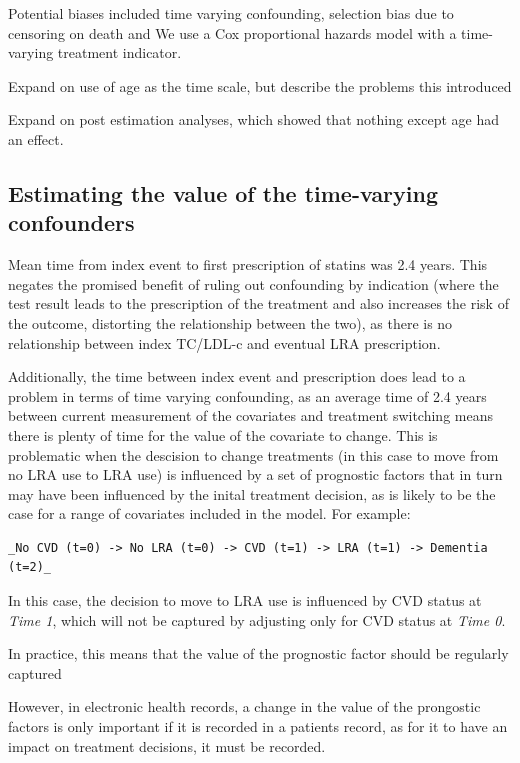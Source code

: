 \documentclass[a4paper, twoside]{templates/ociamthesis}
\begin{document}
Potential biases included time varying confounding, selection bias due to censoring on death and
We use a Cox proportional hazards model with a time-varying treatment indicator.

Expand on use of age as the time scale, but describe the problems this introduced

Expand on post estimation analyses, which showed that nothing except age had an effect.

\hypertarget{estimating-the-value-of-the-time-varying-confounders}{%
\subsection{Estimating the value of the time-varying confounders}\label{estimating-the-value-of-the-time-varying-confounders}}

Mean time from index event to first prescription of statins was 2.4 years. This negates the promised benefit of ruling out confounding by indication (where the test result leads to the prescription of the treatment and also increases the risk of the outcome, distorting the relationship between the two), as there is no relationship between index TC/LDL-c and eventual LRA prescription.

Additionally, the time between index event and prescription does lead to a problem in terms of time varying confounding, as an average time of 2.4 years between current measurement of the covariates and treatment switching means there is plenty of time for the value of the covariate to change. This is problematic when the descision to change treatments (in this case to move from no LRA use to LRA use) is influenced by a set of prognostic factors that in turn may have been influenced by the inital treatment decision, as is likely to be the case for a range of covariates included in the model. For example:

\begin{verbatim}
_No CVD (t=0) -> No LRA (t=0) -> CVD (t=1) -> LRA (t=1) -> Dementia (t=2)_
\end{verbatim}

In this case, the decision to move to LRA use is influenced by CVD status at \emph{Time 1}, which will not be captured by adjusting only for CVD status at \emph{Time 0}.

In practice, this means that the value of the prognostic factor should be regularly captured

However, in electronic health records, a change in the value of the prongostic factors is only important if it is recorded in a patients record, as for it to have an impact on treatment decisions, it must be recorded.
\end{document}
